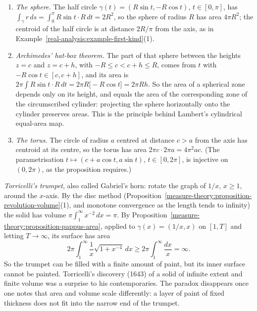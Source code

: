 \begin{example}\label{measure-theory:example-pappus-area}
\begin{enumerate}
\item \emph{The sphere.} The half circle $\gamma(t) = (R\sin t, -R\cos t)$, $t \in [0, \pi]$, has $\int_\gamma r\,ds = \int_0^\pi R\sin t \cdot R\,dt = 2R^2$, so the sphere of radius $R$ has area $4\pi R^2$; the centroid of the half
circle is at distance $2R/\pi$ from the axis, as in Example~\ref{real-analysis:example-first-kind}(1).
\item \emph{Archimedes' hat-box theorem.} The part of that sphere between the heights $z = c$ and $z = c + h$, with $-R \leq c < c + h \leq R$, comes from $t$ with $-R\cos t \in [c, c + h]$, and its area is
$2\pi\int R\sin t \cdot R\,dt = 2\pi R\bigl[-R\cos t\bigr] = 2\pi Rh$. So the area of a spherical zone depends only on its height, and equals the area of the corresponding zone of the circumscribed cylinder: projecting
the sphere horizontally onto the cylinder preserves areas. This is the principle behind Lambert's cylindrical equal-area map.
\item \emph{The torus.} The circle of radius $a$ centred at distance $c > a$ from the axis has centroid at its centre, so the torus has area $2\pi c \cdot 2\pi a = 4\pi^2ac$. (The parametrisation
$t \mapsto (c + a\cos t, a\sin t)$, $t \in [0, 2\pi]$, is injective on $(0, 2\pi)$, as the proposition requires.)
\end{enumerate}
\end{example}

\begin{counterexample}\label{measure-theory:counterexample-gabriel-horn}
\emph{Torricelli's trumpet}, also called Gabriel's horn: rotate the graph of $1/x$, $x \geq 1$, around the $x$-axis. By the disc method (Proposition~\ref{measure-theory:proposition-revolution-volume}(1), and monotone convergence
as the length tends to infinity) the solid has volume $\pi\int_1^\infty x^{-2}\,dx = \pi$. By Proposition~\ref{measure-theory:proposition-pappus-area}, applied to $\gamma(x) = (1/x, x)$ on $[1, T]$ and letting $T \to \infty$,
its surface has area
\[
2\pi\int_1^\infty\frac1x\sqrt{1 + x^{-4}}\,dx \geq 2\pi\int_1^\infty\frac{dx}{x} = \infty .
\]
So the trumpet can be filled with a finite amount of paint, but its inner surface cannot be painted. Torricelli's discovery (1643) of a solid of infinite extent and finite volume was a surprise to his
contemporaries. The paradox disappears once one notes that area and volume scale differently: a layer of paint of fixed thickness does not fit into the narrow end of the trumpet.
\end{counterexample}

